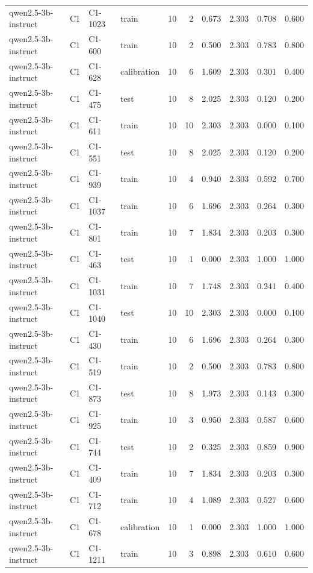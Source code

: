 \begin{table}
\begin{tabular}{llllrrrrrr}
qwen2.5-3b-instruct & C1 & C1-1023 & train & 10 & 2 & 0.673 & 2.303 & 0.708 & 0.600 \\
qwen2.5-3b-instruct & C1 & C1-600 & train & 10 & 2 & 0.500 & 2.303 & 0.783 & 0.800 \\
qwen2.5-3b-instruct & C1 & C1-628 & calibration & 10 & 6 & 1.609 & 2.303 & 0.301 & 0.400 \\
qwen2.5-3b-instruct & C1 & C1-475 & test & 10 & 8 & 2.025 & 2.303 & 0.120 & 0.200 \\
qwen2.5-3b-instruct & C1 & C1-611 & train & 10 & 10 & 2.303 & 2.303 & 0.000 & 0.100 \\
qwen2.5-3b-instruct & C1 & C1-551 & test & 10 & 8 & 2.025 & 2.303 & 0.120 & 0.200 \\
qwen2.5-3b-instruct & C1 & C1-939 & train & 10 & 4 & 0.940 & 2.303 & 0.592 & 0.700 \\
qwen2.5-3b-instruct & C1 & C1-1037 & train & 10 & 6 & 1.696 & 2.303 & 0.264 & 0.300 \\
qwen2.5-3b-instruct & C1 & C1-801 & train & 10 & 7 & 1.834 & 2.303 & 0.203 & 0.300 \\
qwen2.5-3b-instruct & C1 & C1-463 & test & 10 & 1 & 0.000 & 2.303 & 1.000 & 1.000 \\
qwen2.5-3b-instruct & C1 & C1-1031 & train & 10 & 7 & 1.748 & 2.303 & 0.241 & 0.400 \\
qwen2.5-3b-instruct & C1 & C1-1040 & test & 10 & 10 & 2.303 & 2.303 & 0.000 & 0.100 \\
qwen2.5-3b-instruct & C1 & C1-430 & train & 10 & 6 & 1.696 & 2.303 & 0.264 & 0.300 \\
qwen2.5-3b-instruct & C1 & C1-519 & train & 10 & 2 & 0.500 & 2.303 & 0.783 & 0.800 \\
qwen2.5-3b-instruct & C1 & C1-873 & test & 10 & 8 & 1.973 & 2.303 & 0.143 & 0.300 \\
qwen2.5-3b-instruct & C1 & C1-925 & train & 10 & 3 & 0.950 & 2.303 & 0.587 & 0.600 \\
qwen2.5-3b-instruct & C1 & C1-744 & test & 10 & 2 & 0.325 & 2.303 & 0.859 & 0.900 \\
qwen2.5-3b-instruct & C1 & C1-409 & train & 10 & 7 & 1.834 & 2.303 & 0.203 & 0.300 \\
qwen2.5-3b-instruct & C1 & C1-712 & train & 10 & 4 & 1.089 & 2.303 & 0.527 & 0.600 \\
qwen2.5-3b-instruct & C1 & C1-678 & calibration & 10 & 1 & 0.000 & 2.303 & 1.000 & 1.000 \\
qwen2.5-3b-instruct & C1 & C1-1211 & train & 10 & 3 & 0.898 & 2.303 & 0.610 & 0.600 \\

\end{tabular}
\end{table}
